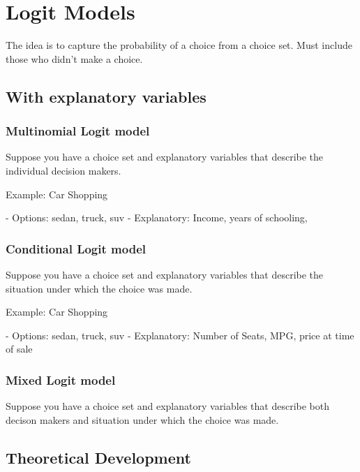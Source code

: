 \documentclass{article}
\begin{document}
\maketitle




\section{Logit Models}
The idea is to capture the probability of a choice from a choice set.
Must include those who didn't make a choice. %

\subsection{With explanatory variables}
\subsubsection{Multinomial Logit model}
Suppose you have a choice set and explanatory variables that describe the 
individual decision makers.

Example: Car Shopping 
\begin{itemize}
 - Options: sedan, truck, suv
 - Explanatory: Income, years of schooling, 
\end{itemize}

\subsubsection{Conditional Logit model}
Suppose you have a choice set and explanatory variables that describe the 
situation under which the choice was made.

Example: Car Shopping
\begin{itemize}
 - Options: sedan, truck, suv
 - Explanatory: Number of Seats, MPG, price at time of sale
\end{itemize}


\subsubsection{Mixed Logit model}
Suppose you have a choice set and explanatory variables that describe both 
decison makers and situation under which the choice was made.

\subsection{Theoretical Development}
\end{document}
